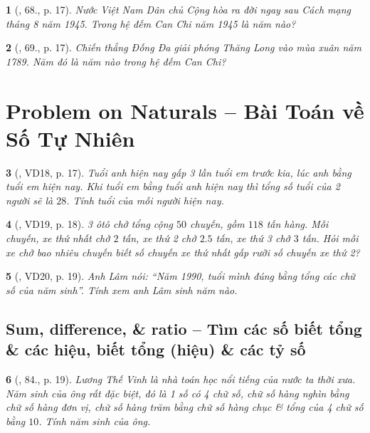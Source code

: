 \documentclass{article}
\newtheorem{baitoan}{}
\begin{document}
\begin{baitoan}[\cite{Tuyen_Toan_6}, 68., p. 17]
	Nước Việt Nam Dân chủ Cộng hòa ra đời ngay sau Cách mạng tháng 8 năm 1945. Trong hệ đếm Can Chi năm 1945 là năm nào?
\end{baitoan}

\begin{baitoan}[\cite{Tuyen_Toan_6}, 69., p. 17]
	Chiến thắng Đống Đa giải phóng Thăng Long vào mùa xuân năm 1789. Năm đó là năm nào trong hệ đếm Can Chi?
\end{baitoan}


\section{Problem on Naturals -- Bài Toán về Số Tự Nhiên}

\begin{baitoan}[\cite{Binh_Toan_6_tap_1}, VD18, p. 17]
	Tuổi anh hiện nay gấp 3 lần tuổi em trước kia, lúc anh bằng tuổi em hiện nay. Khi tuổi em bằng tuổi anh hiện nay thì tổng số tuổi của 2 người sẽ là $28$. Tính tuổi của mỗi người hiện nay.
\end{baitoan}

\begin{baitoan}[\cite{Binh_Toan_6_tap_1}, VD19, p. 18]
	3 ôtô chở tổng cộng $50$ chuyến, gồm $118$ tấn hàng. Mỗi chuyến, xe thứ nhất chở $2$ tấn, xe thứ 2 chở $2.5$ tấn, xe thứ 3 chở $3$ tấn. Hỏi mỗi xe chở bao nhiêu chuyến biết số chuyến xe thứ nhất gấp rưỡi số chuyến xe thứ 2?
\end{baitoan}

\begin{baitoan}[\cite{Binh_Toan_6_tap_1}, VD20, p. 19]
	Anh Lâm nói: ``Năm 1990, tuổi mình đúng bằng tổng các chữ số của năm sinh''. Tính xem anh Lâm sinh năm nào.
\end{baitoan}

\subsection{Sum, difference, \& ratio -- Tìm các số biết tổng \& các hiệu, biết tổng (hiệu) \& các tỷ số}

\begin{baitoan}[\cite{Binh_Toan_6_tap_1}, 84., p. 19]
	Lương Thế Vinh là nhà toán học nổi tiếng của nước ta thời xưa. Năm sinh của ông rất đặc biệt, đó là 1 số có 4 chữ số, chữ số hàng nghìn bằng chữ số hàng đơn vị, chữ số hàng trăm bằng chữ số hàng chục \& tổng của 4 chữ số bằng $10$. Tính năm sinh của ông.
\end{baitoan}
\end{document}
